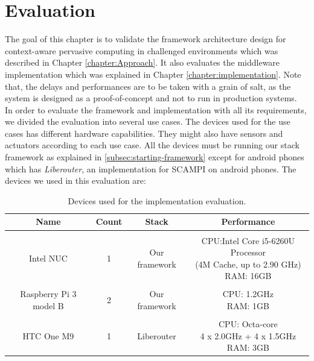
\chapter{Evaluation}\label{chapter:Evaluation}

The goal of this chapter is to validate the framework architecture design for context-aware pervasive computing in challenged environments which was described in Chapter \ref{chapter:Approach}. It also evaluates the middleware implementation which was explained in Chapter \ref{chapter:implementation}. Note that, the delays and performances are to be taken with a grain of salt, as the system is designed as a proof-of-concept and not to run in production systems. \\

\noindent In order to evaluate the framework and implementation with all its requirements, we divided the evaluation into several use cases. The devices used for  the use cases has different hardware capabilities. They might also have  sensors and actuators according to each use case. All the devices must be running our stack framework as explained in \ref{subsec:starting-framework} except for android phones which has \textit{Liberouter}, an implementation for SCAMPI on android phones. The devices we used in this evaluation are:
\begin{table}[!ht]
	\centering
	\begin{tabular}{*{4}{c}}\toprule
		Name & Count & Stack & Performance \\ \hline
		 &  &  &  \\
		Intel NUC &1& 	Our framework &   \specialcell[c]{CPU:Intel Core i5-6260U Processor\\ (4M Cache, up to 2.90 GHz)\\RAM: 16GB }\\ 
		&  &  &  \\
		Raspberry Pi 3 model B & 2 & Our framework &  \specialcell[c]{ CPU: 1.2GHz\\RAM: 1GB}  \\ 
		&  &  &  \\
		HTC One M9 & 1 & Liberouter &   \specialcell[c]{CPU: Octa-core \\4 x 2.0GHz + 4 x 1.5GHz\\ RAM: 3GB} \\ \hline

\end{tabular}
\caption{Devices used for the implementation evaluation.}
\label{table:devoces}
\end{table}


